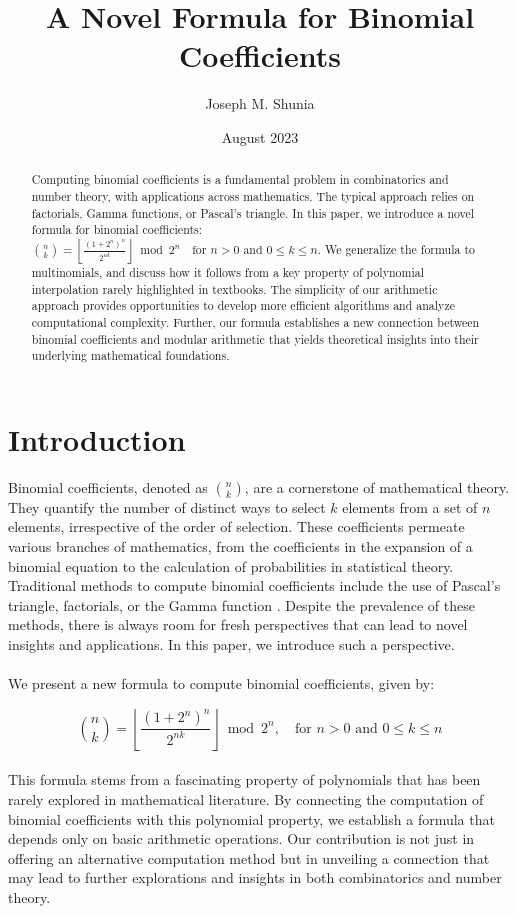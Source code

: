 \documentclass{article}
\title{A Novel Formula for Binomial Coefficients}
\author{Joseph M. Shunia}
\date{August 2023}
\theoremstyle{plain}
\begin{document}
\maketitle

\begin{abstract}
Computing binomial coefficients is a fundamental problem in combinatorics and number theory, with applications across mathematics. The typical approach relies on factorials, Gamma functions, or Pascal's triangle. In this paper, we introduce a novel formula for binomial coefficients: \(\binom{n}{k} = \left\lfloor\frac{(1 + 2^{n})^{n}}{2^{n k}}\right\rfloor \bmod{2^{n}} \quad \text{for } n > 0 \text{ and } 0 \leq k \leq n\). We generalize the formula to multinomials, and discuss how it follows from a key property of polynomial interpolation rarely highlighted in textbooks. The simplicity of our arithmetic approach provides opportunities to develop more efficient algorithms and analyze computational complexity. Further, our formula establishes a new connection between binomial coefficients and modular arithmetic that yields theoretical insights into their underlying mathematical foundations.
\end{abstract}

\section{Introduction}
Binomial coefficients, denoted as \(\binom{n}{k}\), are a cornerstone of mathematical theory. They quantify the number of distinct ways to select \(k\) elements from a set of \(n\) elements, irrespective of the order of selection. These coefficients permeate various branches of mathematics, from the coefficients in the expansion of a binomial equation to the calculation of probabilities in statistical theory. Traditional methods to compute binomial coefficients include the use of Pascal's triangle, factorials, or the Gamma function \cite{brualdi1992introductory}. Despite the prevalence of these methods, there is always room for fresh perspectives that can lead to novel insights and applications. In this paper, we introduce such a perspective.
\\
\\
We present a new formula to compute binomial coefficients, given by:

\begin{equation}
\binom{n}{k} = \left\lfloor\frac{(1 + 2^{n})^{n}}{2^{n k}}\right\rfloor \bmod{2^{n}}, \quad \text{for } n > 0 \text{ and } 0 \leq k \leq n
\end{equation}
\\
This formula stems from a fascinating property of polynomials that has been rarely explored in mathematical literature. By connecting the computation of binomial coefficients with this polynomial property, we establish a formula that depends only on basic arithmetic operations. Our contribution is not just in offering an alternative computation method but in unveiling a connection that may lead to further explorations and insights in both combinatorics and number theory.
\end{document}
